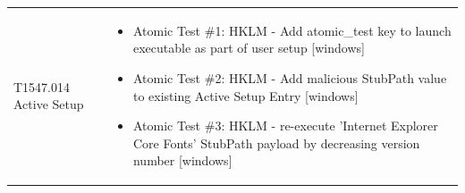 \begin{longtable}{p{} p{}}
T1547.014 Active Setup & \begin{itemize}[leftmargin=*, nosep, topsep=0pt]
  \item Atomic Test \#1: HKLM - Add atomic\_test key to launch executable as part of user setup [windows]
  \item Atomic Test \#2: HKLM - Add malicious StubPath value to existing Active Setup Entry [windows]
  \item Atomic Test \#3: HKLM - re-execute 'Internet Explorer Core Fonts' StubPath payload by decreasing version number [windows]
\end{itemize} \\ [1.5ex]
\end{longtable}